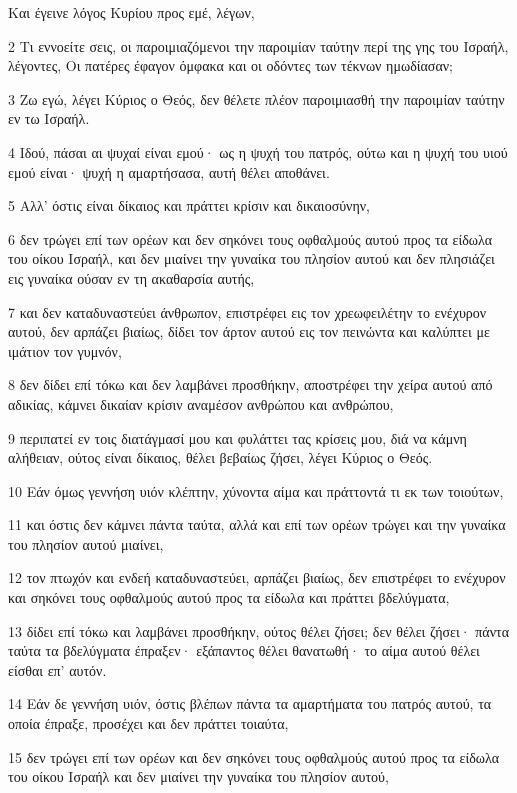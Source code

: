 \par Και έγεινε λόγος Κυρίου προς εμέ, λέγων,
\par 2 Τι εννοείτε σεις, οι παροιμιαζόμενοι την παροιμίαν ταύτην περί της γης του Ισραήλ, λέγοντες, Οι πατέρες έφαγον όμφακα και οι οδόντες των τέκνων ημωδίασαν;
\par 3 Ζω εγώ, λέγει Κύριος ο Θεός, δεν θέλετε πλέον παροιμιασθή την παροιμίαν ταύτην εν τω Ισραήλ.
\par 4 Ιδού, πάσαι αι ψυχαί είναι εμού· ως η ψυχή του πατρός, ούτω και η ψυχή του υιού εμού είναι· ψυχή η αμαρτήσασα, αυτή θέλει αποθάνει.
\par 5 Αλλ' όστις είναι δίκαιος και πράττει κρίσιν και δικαιοσύνην,
\par 6 δεν τρώγει επί των ορέων και δεν σηκόνει τους οφθαλμούς αυτού προς τα είδωλα του οίκου Ισραήλ, και δεν μιαίνει την γυναίκα του πλησίον αυτού και δεν πλησιάζει εις γυναίκα ούσαν εν τη ακαθαρσία αυτής,
\par 7 και δεν καταδυναστεύει άνθρωπον, επιστρέφει εις τον χρεωφειλέτην το ενέχυρον αυτού, δεν αρπάζει βιαίως, δίδει τον άρτον αυτού εις τον πεινώντα και καλύπτει με ιμάτιον τον γυμνόν,
\par 8 δεν δίδει επί τόκω και δεν λαμβάνει προσθήκην, αποστρέφει την χείρα αυτού από αδικίας, κάμνει δικαίαν κρίσιν αναμέσον ανθρώπου και ανθρώπου,
\par 9 περιπατεί εν τοις διατάγμασί μου και φυλάττει τας κρίσεις μου, διά να κάμνη αλήθειαν, ούτος είναι δίκαιος, θέλει βεβαίως ζήσει, λέγει Κύριος ο Θεός.
\par 10 Εάν όμως γεννήση υιόν κλέπτην, χύνοντα αίμα και πράττοντά τι εκ των τοιούτων,
\par 11 και όστις δεν κάμνει πάντα ταύτα, αλλά και επί των ορέων τρώγει και την γυναίκα του πλησίον αυτού μιαίνει,
\par 12 τον πτωχόν και ενδεή καταδυναστεύει, αρπάζει βιαίως, δεν επιστρέφει το ενέχυρον και σηκόνει τους οφθαλμούς αυτού προς τα είδωλα και πράττει βδελύγματα,
\par 13 δίδει επί τόκω και λαμβάνει προσθήκην, ούτος θέλει ζήσει; δεν θέλει ζήσει· πάντα ταύτα τα βδελύγματα έπραξεν· εξάπαντος θέλει θανατωθή· το αίμα αυτού θέλει είσθαι επ' αυτόν.
\par 14 Εάν δε γεννήση υιόν, όστις βλέπων πάντα τα αμαρτήματα του πατρός αυτού, τα οποία έπραξε, προσέχει και δεν πράττει τοιαύτα,
\par 15 δεν τρώγει επί των ορέων και δεν σηκόνει τους οφθαλμούς αυτού προς τα είδωλα του οίκου Ισραήλ και δεν μιαίνει την γυναίκα του πλησίον αυτού,
